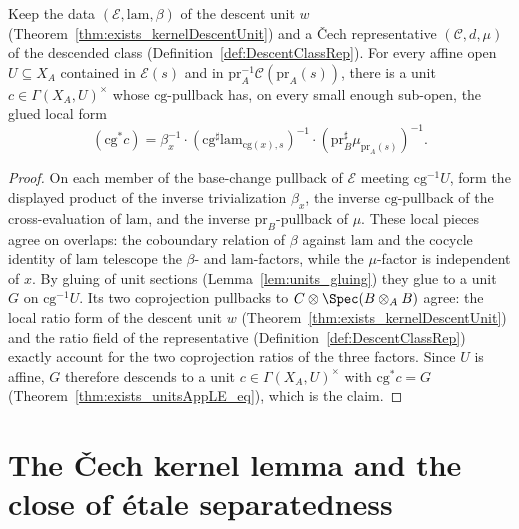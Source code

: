\begin{theorem}
  \label{thm:exists_kernelCobounding}
  \leanok
  Keep the data \((\mathcal E, \mathrm{lam}, \beta)\) of the descent unit \(w\)
  (Theorem~\ref{thm:exists_kernelDescentUnit}) and a \v Cech representative \((\mathcal C, d,
  \mu)\) of the descended class (Definition~\ref{def:DescentClassRep}).  For every affine open
  \(U \subseteq X_A\) contained in \(\mathcal E(s)\) and in \(\mathrm{pr}_A^{-1}\mathcal
  C(\mathrm{pr}_A(s))\), there is a unit \(c \in \Gamma(X_A, U)^{\times}\) whose
  \(\mathrm{cg}\)-pullback has, on every small enough sub-open, the glued local form
  \[
    (\mathrm{cg}^{*} c) = \beta_x^{-1} \cdot (\mathrm{cg}^{\sharp}\mathrm{lam}_{\mathrm{cg}(x),s})^{-1}
      \cdot (\mathrm{pr}_B^{\sharp}\mu_{\mathrm{pr}_A(s)})^{-1}.
  \]
\end{theorem}
\begin{proof}
  \leanok
  On each member of the base-change pullback of \(\mathcal E\) meeting \(\mathrm{cg}^{-1}U\),
  form the displayed product of the inverse trivialization \(\beta_x\), the inverse
  \(\mathrm{cg}\)-pullback of the cross-evaluation of \(\mathrm{lam}\), and the inverse
  \(\mathrm{pr}_B\)-pullback of \(\mu\).  These local pieces agree on overlaps: the coboundary
  relation of \(\beta\) against \(\mathrm{lam}\) and the cocycle identity of \(\mathrm{lam}\)
  telescope the \(\beta\)- and \(\mathrm{lam}\)-factors, while the \(\mu\)-factor is independent
  of \(x\).  By gluing of unit sections (Lemma~\ref{lem:units_gluing}) they glue to a unit \(G\)
  on \(\mathrm{cg}^{-1}U\).  Its two coprojection pullbacks to \(C \otimes \Spec(B \otimes_A B)\)
  agree: the local ratio form of the descent unit \(w\)
  (Theorem~\ref{thm:exists_kernelDescentUnit}) and the ratio field of the representative
  (Definition~\ref{def:DescentClassRep}) exactly account for the two coprojection ratios of the
  three factors.  Since \(U\) is affine, \(G\) therefore descends to a unit \(c \in \Gamma(X_A,
  U)^{\times}\) with \(\mathrm{cg}^{*} c = G\) (Theorem~\ref{thm:exists_unitsAppLE_eq}), which is
  the claim.
\end{proof}

\section{The \v Cech kernel lemma and the close of \'etale separatedness}
\label{sec:cechKernelLemma}

